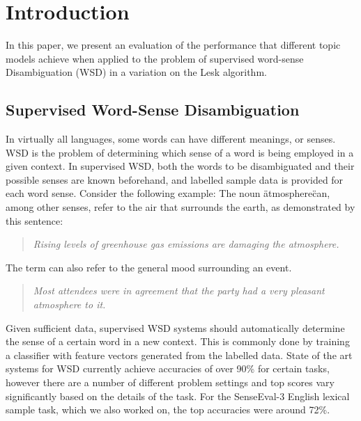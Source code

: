 \section{Introduction}
In this paper, we present an evaluation of the performance that different topic models achieve when applied to the problem of supervised word-sense Disambiguation (WSD) in a variation on the Lesk algorithm. 

\subsection{Supervised Word-Sense Disambiguation}
In virtually all languages, some words can have different meanings, or senses. WSD is the problem of determining  which sense of a word is being employed in a given context. In supervised WSD, both the words to be disambiguated and their possible senses are known beforehand, and labelled sample data is provided for each word sense. Consider the following example: The noun \"atmosphere\" can, among other senses, refer to the air that surrounds the earth, as demonstrated by this sentence:\\
\begin{quotation}
\textit{Rising levels of greenhouse gas emissions are damaging the atmosphere.\\}
\end{quotation}
The term can also refer to the general mood surrounding an event. 
\begin{quotation}
\textit{Most attendees were in agreement that the party had a very pleasant atmosphere to it.\\}
\end{quotation}
Given sufficient data, supervised WSD systems should automatically determine the sense of a certain word in a new context. This is commonly done by training a classifier with feature vectors generated from the labelled data. State of the art systems for WSD currently achieve accuracies of over 90\% for certain tasks\cite{stateofart_scores}, however there are a number of different problem settings and top scores vary significantly based on the details of the task. For the SenseEval-3 English lexical sample task, which we also worked on, the top accuracies were around 72\%\cite{senseval3paper}.


